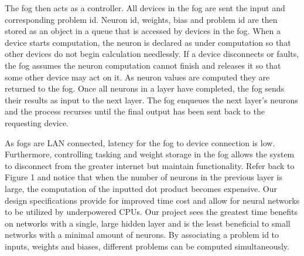 \documentclass{article}
\begin{document}
\begin{multicols}{2}
	The fog then acts as a controller. All devices in the fog are sent the input and corresponding problem id. Neuron id, weights, bias and problem id are then stored as an object in a queue that is accessed by devices in the fog. When a device starts computation, the neuron is declared as under computation so that other devices do not begin calculation needlessly. If a device disconnects or faults, the fog assumes the neuron computation cannot finish and releases it so that some other device may act on it. As neuron values are computed they are returned to the fog. Once all neurons in a layer have completed, the fog sends their results  as input to the next layer. The fog enqueues the next layer’s neurons and the process recurses until the final output has been sent back to the requesting device.
\par
As fogs are LAN connected, latency for the fog to device connection is low. Furthermore, controlling tasking and weight storage in the fog allows the system to disconnect from the greater internet but maintain functionality. Refer back to Figure 1 and notice that when the number of neurons in the previous layer is large, the computation of the inputted dot product becomes expensive. Our design specifications provide for improved time cost and allow for neural networks to be utilized by underpowered CPUs. Our project sees the greatest time benefits on networks with a single, large hidden layer and is the least beneficial to small networks with a minimal amount of neurons. By associating a problem id to inputs, weights and biases, different problems can be computed simultaneously.

\end{multicols}
\end{document}
